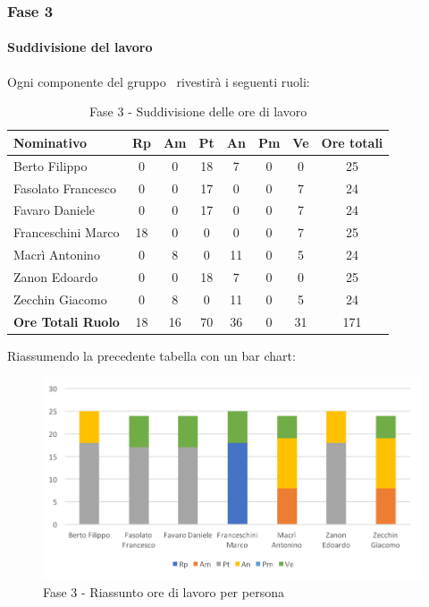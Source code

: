 \documentclass[../PianoDiProgetto.tex]{subfiles}
\begin{document}
		\newpage
		\subsubsection{Fase 3}
			\paragraph{Suddivisione del lavoro}
			Ogni componente del gruppo \kpanic\ rivestirà i seguenti ruoli:
			\begin{table}[h]
				\begin{tabularx}{\textwidth}{l * {6}{C} c}
				\toprule
				\textbf{Nominativo} & \textbf{Rp} & \textbf{Am} & \textbf{Pt} & \textbf{An} & \textbf{Pm} & \textbf{Ve} & \textbf{Ore totali} \\
				\midrule
				Berto Filippo &	0 & 0 & 18 & 7 & 0 & 0 & 25 \\
				Fasolato Francesco & 0 & 0 & 17 & 0 & 0 & 7 & 24 \\
				Favaro Daniele & 0 & 0 & 17 & 0 & 0 & 7 & 24 \\
				Franceschini Marco & 18	& 0 & 0 & 0 & 0 & 7 & 25 \\
				Macrì Antonino & 0 & 8 & 0 & 11 & 0 & 5 & 24 \\
				Zanon Edoardo &	0	& 0 & 18 & 7 & 0	 & 0 & 25 \\
				Zecchin Giacomo & 0 & 8 & 0 & 11 & 0 & 5 & 24 \\
				\midrule			
				\textbf{Ore Totali Ruolo} & 18 & 16 & 70 & 36 & 0 & 31 & 171 \\
				\bottomrule
				\end{tabularx}
				\caption{Fase 3 - Suddivisione delle ore di lavoro}		
			\end{table}
			
			Riassumendo la precedente tabella con un bar chart:	
			\begin{figure}[!h]
				\centering
				\includegraphics[width=\textwidth]{Preventivo/Immagini/fase3_oreRuoloPersona.png}
				\caption{Fase 3 - Riassunto ore di lavoro per persona}
			\end{figure}	
			
\end{document}
